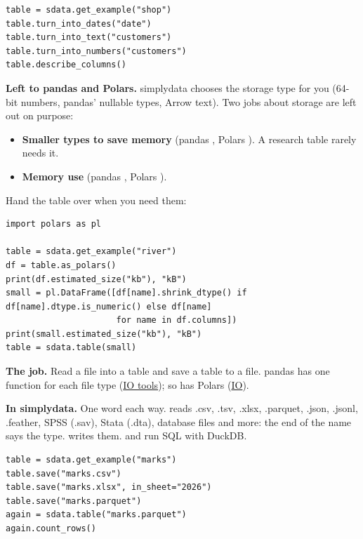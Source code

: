 \begin{lstlisting}[style=py]
table = sdata.get_example("shop")
table.turn_into_dates("date")
table.turn_into_text("customers")
table.turn_into_numbers("customers")
table.describe_columns()
\end{lstlisting}

\textbf{Left to pandas and Polars.} simplydata chooses the storage type for you (64-bit numbers,
pandas' nullable types, Arrow text). Two jobs about storage are left out on purpose:
\begin{itemize}
  \item \textbf{Smaller types to save memory} (pandas , Polars
    ). A research table rarely needs it.
  \item \textbf{Memory use} (pandas , Polars ).
\end{itemize}
Hand the table over when you need them:

\begin{lstlisting}[style=py]
import polars as pl

table = sdata.get_example("river")
df = table.as_polars()
print(df.estimated_size("kb"), "kB")
small = pl.DataFrame([df[name].shrink_dtype() if df[name].dtype.is_numeric() else df[name]
                      for name in df.columns])
print(small.estimated_size("kb"), "kB")
table = sdata.table(small)
\end{lstlisting}


\textbf{The job.} Read a file into a table and save a table to a file. pandas has one function for each
file type (\href{https://pandas.pydata.org/docs/user_guide/io.html}{IO tools}); so has Polars
(\href{https://docs.pola.rs/user-guide/io/}{IO}).

\textbf{In simplydata.} One word each way.  reads .csv, .tsv, .xlsx,
.parquet, .json, .jsonl, .feather, SPSS (.sav), Stata (.dta), database files and more: the end of the
name says the type.  writes them.  and
 run SQL with DuckDB.

\begin{lstlisting}[style=py]
table = sdata.get_example("marks")
table.save("marks.csv")
table.save("marks.xlsx", in_sheet="2026")
table.save("marks.parquet")
again = sdata.table("marks.parquet")
again.count_rows()
\end{lstlisting}

